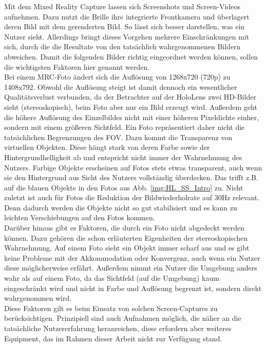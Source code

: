 Mit dem Mixed Reality Capture lassen sich Screenshots und Screen-Videos aufnehmen. Dazu nutzt die Brille ihre integrierte Frontkamera und überlagert deren Bild mit dem gerenderten Bild. So lässt sich besser darstellen, was ein Nutzer sieht. Allerdings bringt dieses Vorgehen mehrere Einschränkungen mit sich, durch die die Resultate von den tatsächlich wahrgenommenen Bildern abweichen. Damit die folgenden Bilder richtig eingeordnet werden können, sollen die wichtigsten Faktoren hier genannt werden.\\

Bei einem MRC-Foto ändert sich die Auflösung von 1268x720 (720p) zu 1408x792. Obwohl die Auflösung steigt ist damit dennoch ein wesentlicher Qualitätsverlust verbunden, da der Betrachter auf der HoloLens zwei HD-Bilder sieht (stereoskopisch), beim Foto aber nur ein Bild erzeugt wird. Außerdem geht die höhere Auflösung des Einzelbildes nicht mit einer höheren Pixeldichte einher, sondern mit einem größeren Sichtfeld. Ein Foto repräsentiert daher nicht die tatsächlichen Begrenzungen des FOV. Dazu kommt die Transparenz von virtuellen Objekten. Diese hängt stark von deren Farbe sowie der Hintergrundhelligkeit ab und entspricht nicht immer der Wahrnehmung des Nutzers. Farbige Objekte erscheinen auf Fotos stets etwas transparent, auch wenn sie den Hintergrund aus Sicht des Nutzers vollständig überdecken. Das trifft z.B. auf die blauen Objekte in den Fotos aus Abb. \ref{img:HL_SS_Intro} zu. Nicht zuletzt ist auch für Fotos die Reduktion der Bildwiederholrate auf 30Hz relevant. Denn dadurch werden die Objekte nicht so gut stabilisiert und es kann zu leichten Verschiebungen auf den Fotos kommen.\\

Darüber hinaus gibt es Faktoren, die durch ein Foto nicht abgedeckt werden können. Dazu gehören die schon erläuterten Eigenheiten der stereoskopischen Wahrnehmung. Auf einem Foto sieht ein Objekt immer scharf aus und es gibt keine Probleme mit der Akkommodation oder Konvergenz, auch wenn ein Nutzer diese möglicherweise erfährt. Außerdem nimmt ein Nutzer die Umgebung anders wahr als auf einem Foto, da das Sichtfeld (auf die Umgebung) kaum eingeschränkt wird und nicht in Farbe und Auflösung begrenzt ist, sondern direkt wahrgenommen wird.\\

Diese Faktoren gilt es beim Einsatz von solchen Screen-Captures zu berücksichtigen. Prinzipiell sind auch Aufnahmen möglich, die näher an die tatsächliche Nutzererfahrung heranreichen, diese erfordern aber weiteres Equipment, das im Rahmen dieser Arbeit nicht zur Verfügung stand.

